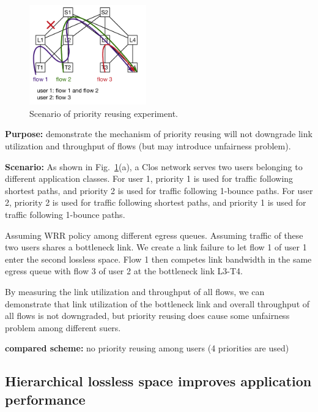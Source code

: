 \begin{figure}
	\centering
	\includegraphics[width=0.45\textwidth] {figs/priorityreusing_1}
	\caption{Scenario of priority reusing experiment.}\label{fig:exp_priorityreusing}
	
\end{figure}

\textbf{Purpose:} demonstrate the mechanism of priority reusing will not downgrade link utilization and throughput of flows (but may introduce unfairness problem).

\textbf{Scenario:} As shown in Fig.~\ref{fig:exp_priorityreusing}(a), a Clos network serves two users belonging to different application classes. For user 1, priority 1 is used for traffic following shortest paths, and priority 2 is used for traffic following 1-bounce paths. For user 2, priority 2 is used for traffic following shortest paths, and priority 1 is used for traffic following 1-bounce paths.

Assuming WRR policy among different egress queues. Assuming traffic of these two users shares a bottleneck link. We create a link failure to let flow 1 of user 1 enter the second lossless space. Flow 1 then competes link bandwidth in the same egress queue with flow 3 of user 2 at the bottleneck link L3-T4. 

By measuring the link utilization and throughput of all flows, we can demonstrate that link utilization of the bottleneck link and overall throughput of all flows is not downgraded, but priority reusing does cause some unfairness problem among different suers.

\textbf{compared scheme:} no priority reusing among users (4 priorities are used)
  
\subsection{Hierarchical lossless space improves application performance}\label{subsec:exp_appperformance}

